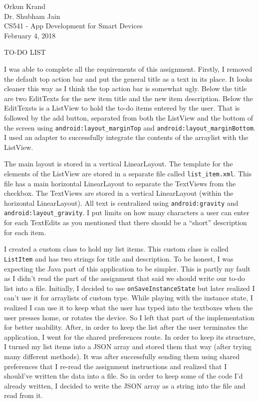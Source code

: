 \documentclass{article}
\begin{document}
\raggedright

Orkun Krand \\ Dr. Shubham Jain \\ CS541 - App Development for Smart Devices \\ February 4, 2018
    
    
	\centerline{TO-DO LIST} 

I was able to complete all the requirements of this assignment. Firstly, I removed the default top action bar and put the general title as a text in its place. It looks cleaner this way as I think the top action bar is somewhat ugly. Below the title are two EditTexts for the new item title and the new item description. Below the EditTexsts is a ListView to hold the to-do items entered by the user. That is followed by the add button, separated from both the ListView and the bottom of the screen using \texttt{android:layout\_marginTop} and \texttt{android:layout\_marginBottom}. I used an adapter to successfully integrate the contents of the arraylist with the ListView.
\hfill \linebreak

The main layout is stored in a vertical LinearLayout. The template for the elements of the ListView are stored in a separate file called \texttt{list\_item.xml}. This file has a main horizontal LinearLayout to separate the TextViews from the checkbox. The TextViews are stored in a vertical LinearLayout (within the horizontal LinearLayout). All text is centralized using \texttt{android:gravity} and \texttt{android:layout\_gravity}. I put limits on how many characters a user can enter for each TextEdits as you mentioned that there should be a ``short'' description for each item.
\hfill \linebreak

I created a custom class to hold my list items. This custom class is called \texttt{ListItem} and has two strings for title and description. To be honest, I was expecting the Java part of this application to be simpler. This is partly my fault as I didn't read the part of the assignment that said we should write our to-do list into a file. Initially, I decided to use \texttt{onSaveInstanceState} but later realized I can't use it for arraylists of custom type. While playing with the instance state, I realized I can use it to keep what the user has typed into the textboxes when the user presses home, or rotates the device. So I left that part of the implementation for better usability. After, in order to keep the list after the user terminates the application, I went for the shared preferences route. In order to keep its structure, I turned my list items into a JSON array and stored them that way (after trying many different methods). It was after successfully sending them using shared preferences that I re-read the assignment instructions and realized that I should've written the data into a file. So in order to keep some of the code I'd already written, I decided to write the JSON array as a string into the file and read from it. 
\hfill \linebreak
\end{document}
